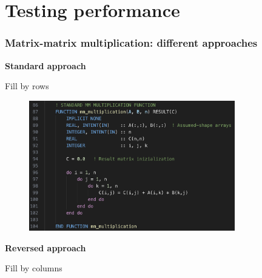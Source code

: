 \documentclass[10pt,externalviewer]{beamer}
\begin{document}
\section{Testing performance}

\begin{frame}
   \frametitle{Matrix-matrix multiplication: different approaches}

   \begin{minipage}{0.45\textwidth}
      \begin{center}
         \small{\textcolor{BrickRed}{\textbf{Standard approach}}}

         \footnotesize{Fill by rows}

         

         \vspace{-0.2cm}

         \begin{figure}[H]
            \centering
            \includegraphics[width=0.8\textwidth]{Immagini/mm-multiplication-standard-code.png}
         \end{figure}

      \end{center}
   \end{minipage}
   \hfill
   \begin{minipage}{0.45\textwidth}
      \begin{center}
         \small{\textcolor{BrickRed}{\textbf{Reversed approach}}}

         \footnotesize{Fill by columns}

         

         \vspace{-0.2cm}


\end{center}
\end{minipage}
\end{frame}
\end{document}

